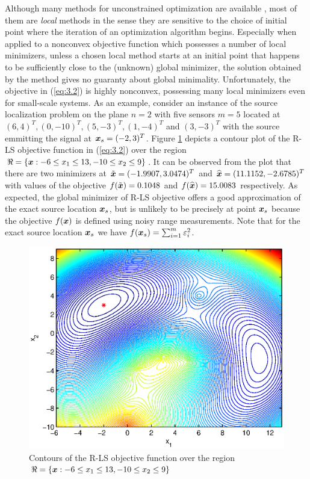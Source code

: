 Although many methods for unconstrained optimization are available \cite{AntonLu}, most of them are \textit{local} methods in the sense they are sensitive to the choice of initial point where the iteration of an optimization algorithm begins. Especially when applied to a nonconvex objective function which possesses a number of local minimizers, unless a chosen local method starts at an initial point that happens to be sufficiently close to the (unknown) global minimizer, the solution obtained by the method gives no guaranty about global minimality. Unfortunately, the objective in (\ref{eq:3.2}) is highly nonconvex, possessing many local minimizers even for small-scale systems. As an example, consider an instance of the source localization problem on the plane $n = 2$ with five sensors $ m = 5$ located at $(6,4)^T, (0,-10)^T, (5,-3)^T, (1,-4)^T$ and  $(3,-3)^T$ with the source emmitting the signal at $\mbox{\boldmath$x$}_s = (-2,3)^T$. Figure \ref{fig:ExampleOfRLSNonconvexity} depicts a contour plot of the R-LS objective function in (\ref{eq:3.2}) over the region $\Re = \{\mbox{\boldmath$x$}: -6 \leq x_1 \leq 13, -10 \leq x_2 \leq 9 \}$. It can be observed from the plot that there are two minimizers at $\tilde{\mbox{\boldmath$x$}} = (-1.9907, 3.0474)^T$ and $\widehat{\mbox{\boldmath$x$}} = (11.1152, -2.6785)^T$ with values of the objective  $f(\tilde{\mbox{\boldmath$x$}}) = 0.1048 $ and $f(\widehat{\mbox{\boldmath$x$}}) = 15.0083$ respectively. As expected, the global minimizer of R-LS objective offers a good approximation of the exact source location $\mbox{\boldmath$x$}_s$, but is unlikely to be precisely at point $\mbox{\boldmath$x$}_s$ because the objective $f(\mbox{\boldmath$x$})$ is defined using noisy range measurements. Note that for the exact source location $\mbox{\boldmath$x$}_s$ we have $f(\mbox{\boldmath$x$}_s) = \sum_{i=1}^m \varepsilon_i^2$.

\phantom{m}

\begin{figure}[t]
\centering
  \includegraphics{figures/nonconvexity_example_ls_new_range}
\caption{Contours of the R-LS objective function over the region $\protect\Re = \protect\lbrace \protect\mbox{\boldmath$x$}:-6\protect\leq x_1 \protect\leq 13, -10\protect\leq x_2 \protect\leq 9 \protect\rbrace$}
\label{fig:ExampleOfRLSNonconvexity}
\end{figure}

